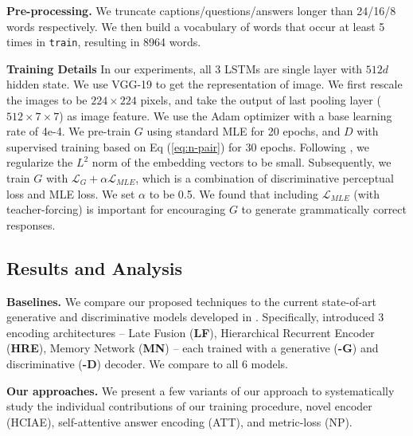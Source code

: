\documentclass{article}
\newcommand{\ourenc}{HCIAE\xspace}
\newcommand{\train}{\texttt{train}\xspace}
\begin{document}
\textbf{Pre-processing.} We truncate captions/questions/answers longer than 24/16/8 words respectively. 
We then build a vocabulary of words that occur at least 5 times in \train, resulting in 8964 words. 

\textbf{Training Details}
In our experiments, all 3 LSTMs are single layer with $512d$ hidden state. 
We use VGG-19 \cite{simonyan2014very} to get the representation of image. We first rescale the images to be $224 \times 224$ pixels, and take the output of last pooling layer ($512 \times 7 \times 7$) as image feature.
We use the Adam optimizer with a base learning rate of 4e-4. We pre-train $G$ using standard MLE 
for 20 epochs, and $D$ with supervised training based on Eq (\ref{eq:n-pair}) for 30 epochs. Following \cite{sohn2016improved}, we regularize the $L^2$ norm of the embedding vectors to be small. Subsequently, we train $G$ with $\mathcal{L}_G + \alpha \mathcal{L}_{MLE}$, which is a combination of discriminative perceptual loss and MLE loss. We set $\alpha$ to be 0.5. 
We found that including $\mathcal{L}_{MLE}$ (with teacher-forcing) is important for encouraging $G$ to generate grammatically correct responses. 

\subsection{Results and Analysis}
\label{exp:result}


\textbf{Baselines.}
We compare our proposed techniques to the current state-of-art generative and discriminative models developed in \cite{visdial}. 
Specifically, \cite{visdial} introduced 3 encoding architectures --  
Late Fusion (\textbf{LF}), Hierarchical Recurrent Encoder (\textbf{HRE}), Memory Network (\textbf{MN}) -- 
each trained with a generative (\textbf{-G}) and discriminative (\textbf{-D}) decoder. We compare to all 6 models. 

\textbf{Our approaches.}
We present a few variants of our approach to systematically study the individual contributions of our training procedure, novel encoder (\ourenc), self-attentive answer encoding (ATT), and metric-loss (NP). 
\end{document}
